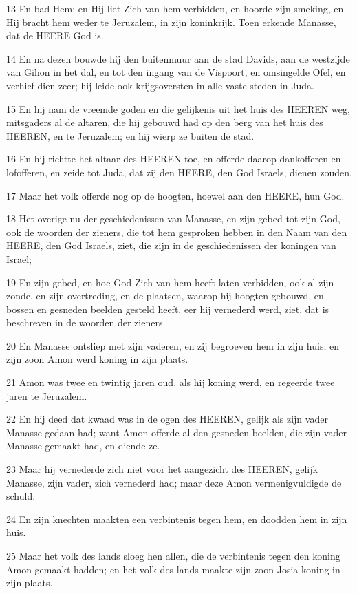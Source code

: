 \par 13 En bad Hem; en Hij liet Zich van hem verbidden, en hoorde zijn smeking, en Hij bracht hem weder te Jeruzalem, in zijn koninkrijk. Toen erkende Manasse, dat de HEERE God is.
\par 14 En na dezen bouwde hij den buitenmuur aan de stad Davids, aan de westzijde van Gihon in het dal, en tot den ingang van de Vispoort, en omsingelde Ofel, en verhief dien zeer; hij leide ook krijgsoversten in alle vaste steden in Juda.
\par 15 En hij nam de vreemde goden en die gelijkenis uit het huis des HEEREN weg, mitsgaders al de altaren, die hij gebouwd had op den berg van het huis des HEEREN, en te Jeruzalem; en hij wierp ze buiten de stad.
\par 16 En hij richtte het altaar des HEEREN toe, en offerde daarop dankofferen en lofofferen, en zeide tot Juda, dat zij den HEERE, den God Israels, dienen zouden.
\par 17 Maar het volk offerde nog op de hoogten, hoewel aan den HEERE, hun God.
\par 18 Het overige nu der geschiedenissen van Manasse, en zijn gebed tot zijn God, ook de woorden der zieners, die tot hem gesproken hebben in den Naam van den HEERE, den God Israels, ziet, die zijn in de geschiedenissen der koningen van Israel;
\par 19 En zijn gebed, en hoe God Zich van hem heeft laten verbidden, ook al zijn zonde, en zijn overtreding, en de plaatsen, waarop hij hoogten gebouwd, en bossen en gesneden beelden gesteld heeft, eer hij vernederd werd, ziet, dat is beschreven in de woorden der zieners.
\par 20 En Manasse ontsliep met zijn vaderen, en zij begroeven hem in zijn huis; en zijn zoon Amon werd koning in zijn plaats.
\par 21 Amon was twee en twintig jaren oud, als hij koning werd, en regeerde twee jaren te Jeruzalem.
\par 22 En hij deed dat kwaad was in de ogen des HEEREN, gelijk als zijn vader Manasse gedaan had; want Amon offerde al den gesneden beelden, die zijn vader Manasse gemaakt had, en diende ze.
\par 23 Maar hij vernederde zich niet voor het aangezicht des HEEREN, gelijk Manasse, zijn vader, zich vernederd had; maar deze Amon vermenigvuldigde de schuld.
\par 24 En zijn knechten maakten een verbintenis tegen hem, en doodden hem in zijn huis.
\par 25 Maar het volk des lands sloeg hen allen, die de verbintenis tegen den koning Amon gemaakt hadden; en het volk des lands maakte zijn zoon Josia koning in zijn plaats.

